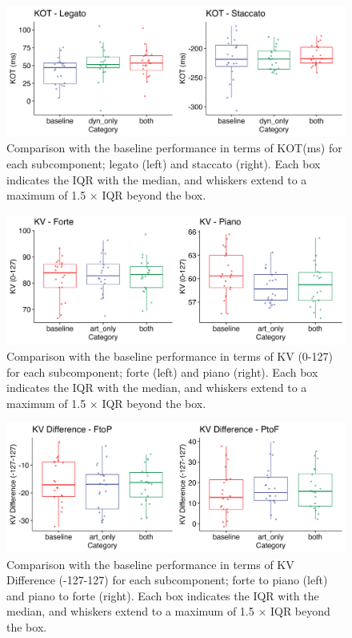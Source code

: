 \documentclass[
  man,floatsintext]{apa6}
\begin{document}
\begin{figure}
\includegraphics[width=1\linewidth]{manuscript_files/figure-latex/plot-kot-2-1} \caption{\label{fig:kot-2}Comparison with the baseline performance in terms of KOT(ms) for each subcomponent; legato (left) and staccato (right). Each box indicates the IQR with the median, and whiskers extend to a maximum of 1.5 × IQR beyond the box.}\label{fig:plot-kot-2}
\end{figure}

\begin{figure}
\includegraphics[width=1\linewidth]{manuscript_files/figure-latex/plot-vel-2-1} \caption{\label{fig:vel-2}Comparison with the baseline performance in terms of KV (0-127) for each subcomponent; forte (left) and piano (right). Each box indicates the IQR with the median, and whiskers extend to a maximum of 1.5 × IQR beyond the box.}\label{fig:plot-vel-2}
\end{figure}

\begin{figure}
\includegraphics[width=1\linewidth]{manuscript_files/figure-latex/plot-vel-diff-2-1} \caption{\label{fig:vel-diff-2}Comparison with the baseline performance in terms of KV Difference (-127-127) for each subcomponent; forte to piano (left) and piano to forte (right). Each box indicates the IQR with the median, and whiskers extend to a maximum of 1.5 × IQR beyond the box.}\label{fig:plot-vel-diff-2}
\end{figure}
\end{document}
